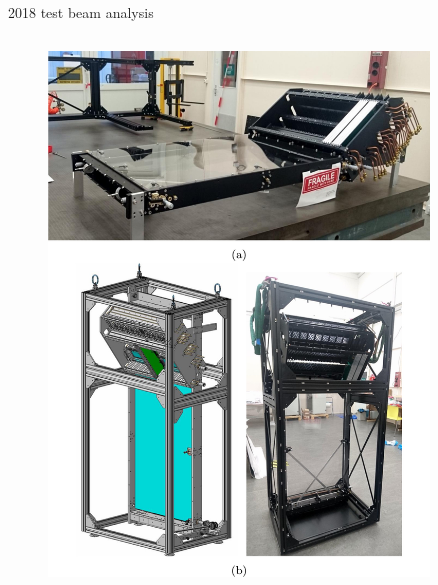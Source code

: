 \documentclass[xcolor={dvipsnames}]{beamer}
\begin{document}
\begin{frame}{2018 test beam analysis}
\begin{columns}
\begin{column}{0.4\textwidth}
\begin{figure}
        \includegraphics[width = 0.9\textwidth,trim={4.5cm 0.5cm 0 5cm},clip=true]{Figs/TORCH_testbeam_2018_structure.jpg}
      \end{figure}
    \end{column}
  \end{columns}
\end{frame}
\end{document}
